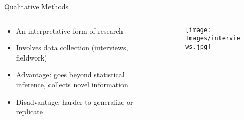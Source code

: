 \documentclass[10pt, aspectratio=169]{beamer}
\begin{document}
\begin{frame}{Qualitative Methods}
\begin{columns}[T]
\begin{column}{0.6\textwidth}
\begin{itemize}
    \item An interpretative form of research \vspace{0.3cm}
    \item Involves data collection (interviews, fieldwork) \vspace{0.3cm}
    \item Advantage: goes beyond statistical inference, collects novel information \vspace{0.3cm}
    \item Disadvantage: harder to generalize or replicate \vspace{0.3cm}
\end{itemize}
\end{column}

\begin{column}{0.4\textwidth}
\begin{figure}
    \centering
    \texttt{[image: Images/interviews.jpg]}
    \label{fig:enter-label}
\end{figure}
\end{column}
\end{columns}
\end{frame}
\end{document}
